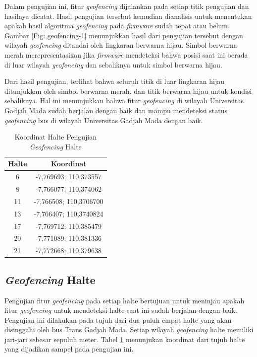 Dalam pengujian ini, fitur \textit{geofencing} dijalankan pada setiap titik pengujian dan hasilnya dicatat. Hasil pengujian tersebut kemudian dianalisis untuk menentukan apakah hasil algoritma \textit{geofencing} pada \textit{firmware} sudah tepat atau belum. Gambar \ref{Fig: geofencing-1} menunjukkan hasil dari pengujian tersebut dengan wilayah \textit{geofencing} ditandai oleh lingkaran berwarna hijau. Simbol berwarna merah merepresentasikan jika \textit{firmware} mendeteksi bahwa posisi saat ini berada di luar wilayah \textit{geofencing} dan sebaliknya untuk simbol berwarna hijau.

Dari hasil pengujian, terlihat bahwa seluruh titik di luar lingkaran hijau ditunjukkan oleh simbol berwarna merah, dan titik berwarna hijau untuk kondisi sebaliknya. Hal ini menunjukkan bahwa fitur \textit{geofencing} di wilayah Universitas Gadjah Mada sudah berjalan dengan baik dan mampu mendeteksi status \textit{geofencing} bus di wilayah Universitas Gadjah Mada dengan baik.

\begin{table}[H]
	\caption{Koordinat Halte Pengujian \textit{Geofencing} Halte}
	\vspace{0.5em}
	\centering
	\begin{tabular}{cc}
		\hline
		\textbf{Halte} &\textbf{Koordinat} \\
		\hline
		6 & -7,769693; 110,373557 \\
		8 &-7,766077; 110,374062\\ 
		11 &-7,766508; 110,3706700\\
		13 & -7,766407; 110,3740824\\
		17 &-7,769712; 110,385479\\ 
		20 & -7,771089; 110,381336\\
		21 & -7,772668; 110,379638\\
		\hline
	\end{tabular}
	\label{Tab: geofencing-2}
\end{table}

\subsection{\textit{Geofencing} Halte}
Pengujian fitur \textit{geofencing} pada setiap halte bertujuan untuk meninjau apakah fitur \textit{geofencing} untuk mendeteksi halte saat ini sudah berjalan dengan baik. Pengujian ini dilakukan pada tujuh dari dua puluh empat halte yang akan disinggahi oleh bus Trans Gadjah Mada. Setiap wilayah \textit{geofencing} halte memiliki jari-jari sebesar sepuluh meter. Tabel \ref{Tab: geofencing-2} menunjukan koordinat dari tujuh halte yang dijadikan sampel pada pengujian ini.

